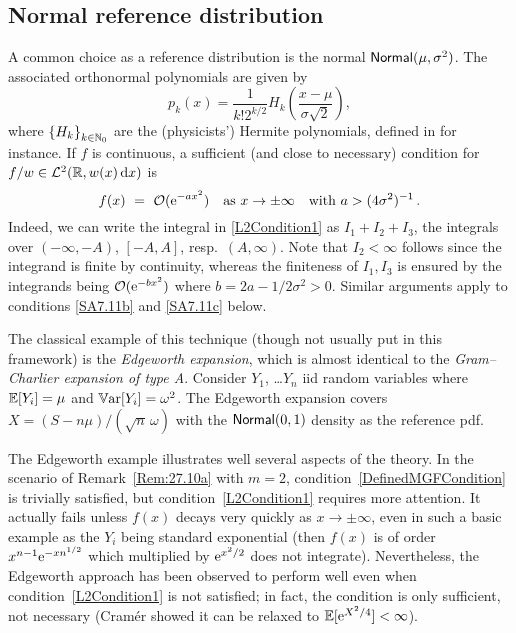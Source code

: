\subsection{Normal reference distribution}\label{SS:NormalNu}
A common choice as a reference distribution is the normal $\mathsf{Normal}(\mu,\sigma^{2})$. The associated orthonormal polynomials are given by
\begin{equation}\label{eq:NormalDistributionOrthogonalPolynomial}
p_{k}(x)=\frac{1}{k!2^{k/2}}H_{k}\left(\frac{x-\mu}{\sigma\sqrt{2}}\right),
\end{equation}
where $\left\{H_{k}\right\}_{k\in\mathbb{N}_0}$ are the (physicists') Hermite polynomials, defined in \cite{Szegoe1939} for instance.
If $f$ is continuous, a sufficient (and close to necessary) condition for $f/w\in\mathcal{L}^2(\mathbb{R}, w(x) \mathop{}\!\mathrm{d} x)$ is
\begin{equation}\label{SA7.11a}
f(x)\ =\ {\mathcal{O}}(\mathrm{e}^{-ax^2})\quad\text{as }x\to\pm\infty\quad\text{with } a>(4\sigma^2)^{-1}\,.
\end{equation}
Indeed, we can  write the integral in \eqref{L2Condition1} as $I_1+I_2+I_3$, the integrals over
$(-\infty,-A)$, $[-A,A]$, resp.\ $(A,\infty)$. Note that $I_2<\infty$  follows since the integrand
is finite by continuity, whereas the finiteness of $I_1,I_3$ is ensured by the integrands
being ${\mathcal{O}}(\mathrm{e}^{-bx^2})$ where $b=2a-1/2\sigma^2>0$. Similar arguments apply to
conditions \eqref{SA7.11b} and \eqref{SA7.11c} below.

\begin{example}\label{Ex:27.10a}
The classical example of this technique (though not usually put in this framework)
is the \emph{Edgeworth expansion}, which is almost identical to the \emph{Gram--Charlier expansion of type A}.
Consider $Y_1$, \dots $Y_n$ iid random variables where $\operatorname{{\mathbb E}}[Y_i]=\mu$ and $\operatorname{\mathbb{V}\mathrm{ar}}[Y_i]=\omega^2$.
The Edgeworth expansion covers $X=(S-n\mu)/(\sqrt{n}\,\omega)$ with the $\mathsf{Normal}(0,1)$ density as the reference pdf.

The Edgeworth example illustrates well several aspects of the theory. In the scenario of Remark~\ref{Rem:27.10a} with $m=2$, condition~\eqref{DefinedMGFCondition} is trivially satisfied,
but condition~\eqref{L2Condition1} requires more attention. It actually fails unless
$f(x)$ decays very quickly as $x \to\pm \infty$, even in such a basic example as the $Y_i$
being standard exponential (then $f(x)$ is of order $x^{n-1} \mathrm{e}^{-xn^{1/2}}$
which multiplied by $\mathrm{e}^{x^2/2}$ does not integrate). Nevertheless, the Edgeworth approach
has been observed to perform well even when condition~\eqref{L2Condition1} is not satisfied;
in fact, the condition is only sufficient, not necessary (Cram{\'e}r \cite{cramer1926some} showed it can be relaxed to
$\operatorname{{\mathbb E}} [\mathrm{e}^{X^2/4}]<\infty$).
\remQED
\end{example}

